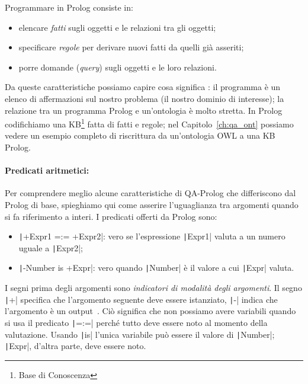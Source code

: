Programmare in Prolog consiste in:
\begin{itemize}
	\item elencare \emph{fatti} sugli oggetti e le relazioni tra gli oggetti;
	\item specificare \emph{regole} per derivare nuovi fatti da quelli già asseriti;
	\item porre domande (\emph{query}) sugli oggetti e le loro relazioni.
\end{itemize}

Da queste caratteristiche possiamo capire cosa significa : il programma è un elenco di affermazioni sul nostro problema (il nostro dominio di interesse); la relazione tra un programma Prolog e un'ontologia è molto stretta. In Prolog codifichiamo una KB\footnote{Base di Conoscenza} fatta di fatti e regole; nel Capitolo~\ref{ch:qa_ont} possiamo vedere un esempio completo di riscrittura da un'ontologia OWL a una KB Prolog.

\paragraph{Predicati aritmetici:}\label{par:arithmetic} Per comprendere meglio alcune caratteristiche di QA-Prolog che differiscono dal Prolog di base, spieghiamo qui come asserire l'uguaglianza tra argomenti quando si fa riferimento a interi. I predicati offerti da Prolog sono:
\begin{itemize}
	\item \texttt|+Expr1 =:= +Expr2|: vero se l'espressione \texttt|Expr1| valuta a un numero uguale a \texttt|Expr2|;
	\item \texttt|-Number is +Expr|: vero quando \texttt|Number| è il valore a cui \texttt|Expr| valuta.
\end{itemize}
I segni prima degli argomenti sono \emph{indicatori di modalità degli argomenti}. Il segno \texttt|+| specifica che l'argomento seguente deve essere istanziato, \texttt|-| indica che l'argomento è un output~\cite{SWI2026PrologManual}. Ciò significa che non possiamo avere variabili quando si usa il predicato \texttt|=:=| perché tutto deve essere noto al momento della valutazione. Usando \texttt|is| l'unica variabile può essere il valore di \texttt|Number|; \texttt|Expr|, d'altra parte, deve essere noto.

